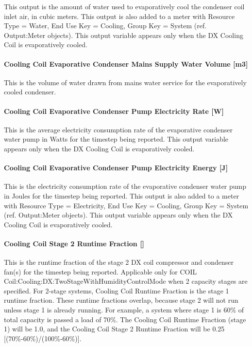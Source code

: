 This output is the amount of water used to evaporatively cool the condenser coil inlet air, in cubic meters. This output is also added to a meter with Resource Type = Water, End Use Key = Cooling, Group Key = System (ref. Output:Meter objects). This output variable appears only when the DX Cooling Coil is evaporatively cooled.

\paragraph{Cooling Coil Evaporative Condenser Mains Supply Water Volume {[}m3{]}}\label{cooling-coil-evaporative-condenser-mains-supply-water-volume-m3}

This is the volume of water drawn from mains water service for the evaporatively cooled condenser.

\paragraph{Cooling Coil Evaporative Condenser Pump Electricity Rate {[}W{]}}\label{cooling-coil-evaporative-condenser-pump-electric-power-w}

This is the average electricity consumption rate of the evaporative condenser water pump in Watts for the timestep being reported. This output variable appears only when the DX Cooling Coil is evaporatively cooled.

\paragraph{Cooling Coil Evaporative Condenser Pump Electricity Energy {[}J{]}}\label{cooling-coil-evaporative-condenser-pump-electric-energy-j}

This is the electricity consumption rate of the evaporative condenser water pump in Joules for the timestep being reported. This output is also added to a meter with Resource Type = Electricity, End Use Key = Cooling, Group Key = System (ref. Output:Meter objects). This output variable appears only when the DX Cooling Coil is evaporatively cooled.

\paragraph{Cooling Coil Stage 2 Runtime Fraction {[]}}\label{cooling-coil-stage-2-runtime-fraction}

This is the runtime fraction of the stage 2 DX coil compressor and condenser fan(s) for the timestep being reported. Applicable only for COIL Coil:Cooling:DX:TwoStageWithHumidityControlMode when 2 capacity stages are specified. For 2-stage systems, Cooling Coil Runtime Fraction is the stage 1 runtime fraction. These runtime fractions overlap, because stage 2 will not run unless stage 1 is already running. For example, a system where stage 1 is 60\% of total capacity is passed a load of 70\%. The Cooling Coil Runtime Fraction (stage 1) will be 1.0, and the Cooling Coil Stage 2 Runtime Fraction will be 0.25 {[}(70\%-60\%)/(100\%-60\%){]}.

